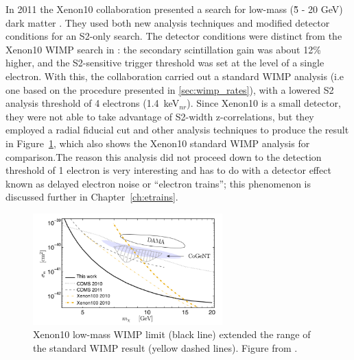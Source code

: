 In 2011 the Xenon10 collaboration presented a search for low-mass (\~5 - 20 GeV) dark matter \cite{Angle2011}. They used both new analysis techniques and modified detector conditions for an S2-only search. The detector conditions were distinct from the Xenon10 \ac{WIMP} search in \cite{Xenon10WIMP}: the secondary scintillation gain was about 12\% higher, and the S2-sensitive trigger threshold was set at the level of a single electron. With this, the collaboration carried out a standard \ac{WIMP} analysis (i.e one based on the procedure presented in \ref{sec:wimp_rates}), with a lowered S2 analysis threshold of 4 electrons (1.4~keV$_{nr}$). Since Xenon10 is a small detector, they were not able to take advantage of S2-width z-correlations, but they employed a radial fiducial cut and other analysis techniques to produce the result in Figure~\ref{fig:xenon10lowmass}, which also shows the Xenon10 standard \ac{WIMP} analysis for comparison.The reason this analysis did not proceed down to the detection threshold of 1 electron is very interesting and has to do with a detector effect known as delayed electron noise or ``electron trains''; this phenomenon is discussed further in Chapter~\ref{ch:etrains}. 

\begin{figure}[htbp]
\begin{center}
\includegraphics[width=0.65\textwidth]{figures/lxetpcs/xenon10lowmass.png}
\caption{Xenon10 low-mass \acs{WIMP} limit (black line) extended the range of the standard \acs{WIMP} result (yellow dashed lines). Figure from \cite{Angle2011}. }
\label{fig:xenon10lowmass}
\end{center}
\end{figure}


